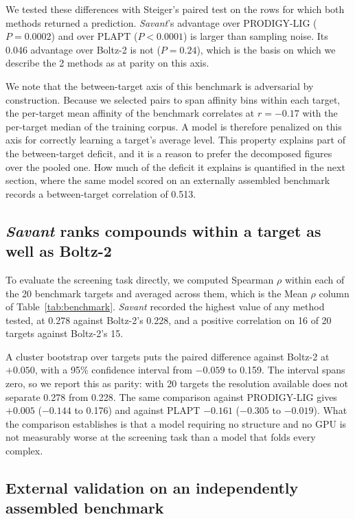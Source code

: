 \documentclass[times, twoside]{zHenriquesLab-StyleBioRxiv}
\newcommand{\savant}{\textit{Savant}\xspace}
\begin{document}
We tested these differences with Steiger's paired test on the rows for which both methods returned a prediction. \savant's advantage over PRODIGY-LIG ($P = 0.0002$) and over PLAPT ($P < 0.0001$) is larger than sampling noise. Its 0.046 advantage over Boltz-2 is not ($P = 0.24$), which is the basis on which we describe the 2 methods as at parity on this axis.

We note that the between-target axis of this benchmark is adversarial by construction. Because we selected pairs to span affinity bins within each target, the per-target mean affinity of the benchmark correlates at $r = -0.17$ with the per-target median of the training corpus. A model is therefore penalized on this axis for correctly learning a target's average level. This property explains part of the between-target deficit, and it is a reason to prefer the decomposed figures over the pooled one. How much of the deficit it explains is quantified in the next section, where the same model scored on an externally assembled benchmark records a between-target correlation of 0.513.

\subsection*{\savant ranks compounds within a target as well as Boltz-2}

To evaluate the screening task directly, we computed Spearman $\rho$ within each of the 20 benchmark targets and averaged across them, which is the Mean $\rho$ column of Table~\ref{tab:benchmark}. \savant recorded the highest value of any method tested, at 0.278 against Boltz-2's 0.228, and a positive correlation on 16 of 20 targets against Boltz-2's 15.

A cluster bootstrap over targets puts the paired difference against Boltz-2 at $+0.050$, with a 95\% confidence interval from $-0.059$ to 0.159. The interval spans zero, so we report this as parity: with 20 targets the resolution available does not separate 0.278 from 0.228. The same comparison against PRODIGY-LIG gives $+0.005$ ($-0.144$ to 0.176) and against PLAPT $-0.161$ ($-0.305$ to $-0.019$). What the comparison establishes is that a model requiring no structure and no GPU is not measurably worse at the screening task than a model that folds every complex.

\subsection*{External validation on an independently assembled benchmark}
\end{document}
